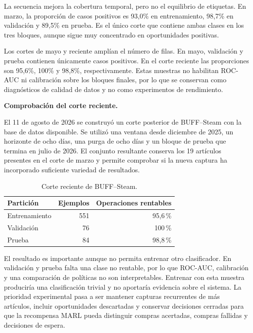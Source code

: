 La secuencia mejora la cobertura temporal, pero no el equilibrio de etiquetas. En marzo, la proporción de casos positivos es 93,0\% en entrenamiento, 98,7\% en validación y 89,5\% en prueba. Es el único corte que contiene ambas clases en los tres bloques, aunque sigue muy concentrado en oportunidades positivas.

Los cortes de mayo y reciente amplían el número de filas. En mayo, validación y prueba contienen únicamente casos positivos. En el corte reciente las proporciones son 95,6\%, 100\% y 98,8\%, respectivamente. Estas muestras no habilitan ROC-AUC ni calibración sobre los bloques finales, por lo que se conservan como diagnósticos de calidad de datos y no como experimentos de rendimiento.

\textbf{Comprobación del corte reciente.}

El 11 de agosto de 2026 se construyó un corte posterior de BUFF--Steam con la base de datos disponible. Se utilizó una ventana desde diciembre de 2025, un horizonte de ocho días, una purga de ocho días y un bloque de prueba que termina en julio de 2026. El conjunto resultante conserva los 19 artículos presentes en el corte de marzo y permite comprobar si la nueva captura ha incorporado suficiente variedad de resultados.

\begin{table}[H]
\centering
\begin{tabular}{l r r}
\toprule
Partición & Ejemplos & Operaciones rentables \\
\midrule
Entrenamiento & 551 & 95,6\,\% \\
Validación & 76 & 100\,\% \\
Prueba & 84 & 98,8\,\% \\
\bottomrule
\end{tabular}
\caption{Corte reciente de BUFF--Steam.}
\label{tab:corte-reciente}
\end{table}

El resultado es importante aunque no permita entrenar otro clasificador. En validación y prueba falta una clase no rentable, por lo que ROC-AUC, calibración y una comparación de políticas no son interpretables. Entrenar con esta muestra produciría una clasificación trivial y no aportaría evidencia sobre el sistema. La prioridad experimental pasa a ser mantener capturas recurrentes de más artículos, incluir oportunidades descartadas y conservar decisiones cerradas para que la recompensa MARL pueda distinguir compras acertadas, compras fallidas y decisiones de espera.


